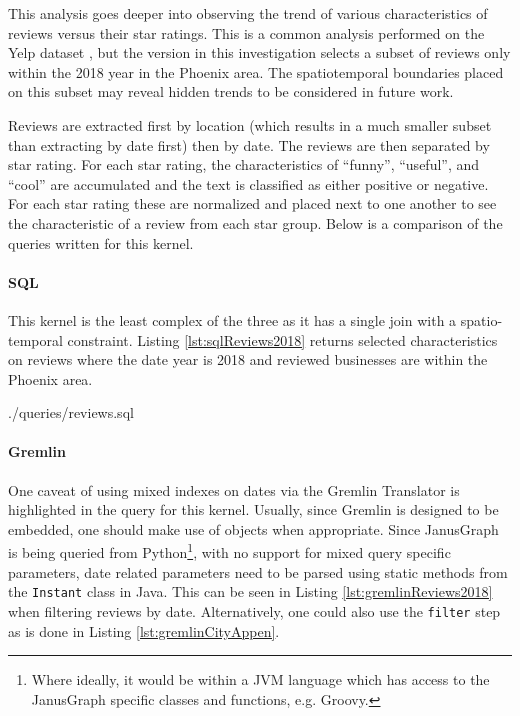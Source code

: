 
This analysis goes deeper into observing the trend of various characteristics of reviews versus their star ratings. This is a common analysis performed on the Yelp dataset \cite{yelp-trends-zhang}, but the version in this investigation selects a subset of reviews only within the 2018 year in the Phoenix area. The spatiotemporal boundaries placed on this subset may reveal hidden trends to be considered in future work.

Reviews are extracted first by location (which results in a much smaller subset than extracting by date first) then by date. The reviews are then separated by star rating. For each star rating, the characteristics of ``funny'', ``useful'', and ``cool'' are accumulated and the text is classified as either positive or negative. For each star rating these are normalized and placed next to one another to see the characteristic of a review from each star group. Below is a comparison of the queries written for this kernel.

\paragraph{SQL}

This kernel is the least complex of the three as it has a single join with a spatio-temporal constraint. Listing \ref{lst:sqlReviews2018} returns selected characteristics on reviews where the date year is 2018 and reviewed businesses are within the Phoenix area.


{./queries/reviews.sql}

\paragraph{Gremlin}

One caveat of using mixed indexes on dates via the Gremlin Translator is highlighted in the query for this kernel. Usually, since Gremlin is designed to be embedded, one should make use of objects when appropriate. Since JanusGraph is being queried from Python\footnote{Where ideally, it would be within a JVM language which has access to the JanusGraph specific classes and functions, e.g. Groovy.}, with no support for mixed query specific parameters, date related parameters need to be parsed using static methods from the \texttt{Instant} class in Java. This can be seen in Listing \ref{lst:gremlinReviews2018} when filtering reviews by date. Alternatively, one could also use the \texttt{filter} step as is done in Listing \ref{lst:gremlinCityAppen}.

